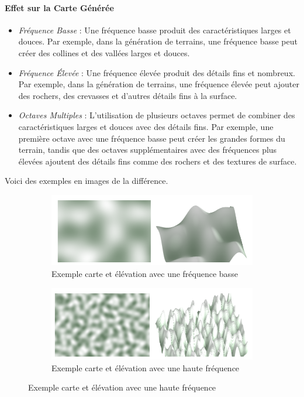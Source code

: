     \paragraph{Effet sur la Carte Générée}
    \begin{itemize}
        \item \textit{Fréquence Basse} : Une fréquence basse produit des caractéristiques larges et douces. Par exemple, dans la génération de terrains, une fréquence basse peut créer des collines et des vallées larges et douces.
        \item \textit{Fréquence Élevée} : Une fréquence élevée produit des détails fins et nombreux. Par exemple, dans la génération de terrains, une fréquence élevée peut ajouter des rochers, des crevasses et d'autres détails fins à la surface.
        \item \textit{Octaves Multiples} : L'utilisation de plusieurs octaves permet de combiner des caractéristiques larges et douces avec des détails fins. Par exemple, une première octave avec une fréquence basse peut créer les grandes formes du terrain, tandis que des octaves supplémentaires avec des fréquences plus élevées ajoutent des détails fins comme des rochers et des textures de surface.
    \end{itemize}
    \newpage
    Voici des exemples en images de la différence.

    \begin{figure}[!h]
    \centering
    \begin{subfigure}{0.4\linewidth}
        \centering
        \includegraphics[width=\linewidth]{images/low_frequency.png}
        \caption{Exemple carte et élévation avec une fréquence basse}
        \label{fig:image_avant_expansion}
    \end{subfigure}
    \hfill
    \begin{subfigure}{0.4\linewidth}
        \centering
        \includegraphics[width=\linewidth]{images/hight_frequency.png}
        \caption{Exemple carte et élévation avec une haute fréquence}
        \label{fig:histo_avant_expansion}
    \end{subfigure}

\end{figure}

